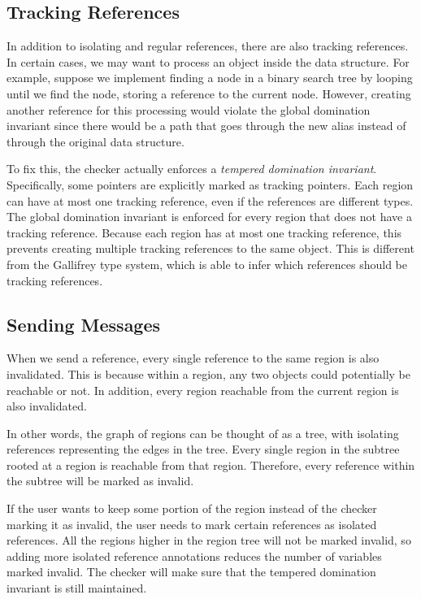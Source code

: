 \documentclass{article}
\begin{document}
  \subsection{Tracking References}

  In addition to isolating and regular references,
    there are also tracking references.
  In certain cases,
    we may want to process an object inside the data structure.
  For example,
    suppose we implement finding a node in a binary search tree
    by looping until we find the node,
    storing a reference to the current node.
  However,
    creating another reference for this processing would violate the global domination invariant
    since there would be a path that goes through the new alias
    instead of through the original data structure.

  To fix this,
    the checker actually enforces a \textit{tempered domination invariant}.
  Specifically,
    some pointers are explicitly marked as tracking pointers.
  Each region can have at most one tracking reference,
    even if the references are different types.
  The global domination invariant is enforced for every region  
    that does not have a tracking reference. 
  Because each region has at most one tracking reference,
    this prevents creating multiple tracking references to the same object.
  This is different from the Gallifrey type system,
    which is able to infer which references should be tracking references.

  \subsection{Sending Messages}

  When we send a reference,
    every single reference to the same region is also invalidated.
  This is because within a region,
    any two objects could potentially be reachable or not.
  In addition,
    every region reachable from the current region is also invalidated.
  
  In other words,
    the graph of regions can be thought of as a tree,
    with isolating references representing the edges in the tree.
  Every single region in the subtree rooted at a region is reachable from that region.
  Therefore,
    every reference within the subtree will be marked as invalid.
  
  If the user wants to keep some portion of the region
    instead of the checker marking it as invalid,
    the user needs to mark certain references as isolated references.
  All the regions higher in the region tree will not be marked invalid,
    so adding more isolated reference annotations reduces the number of variables marked invalid.
  The checker will make sure that the tempered domination invariant is still maintained.
\end{document}
